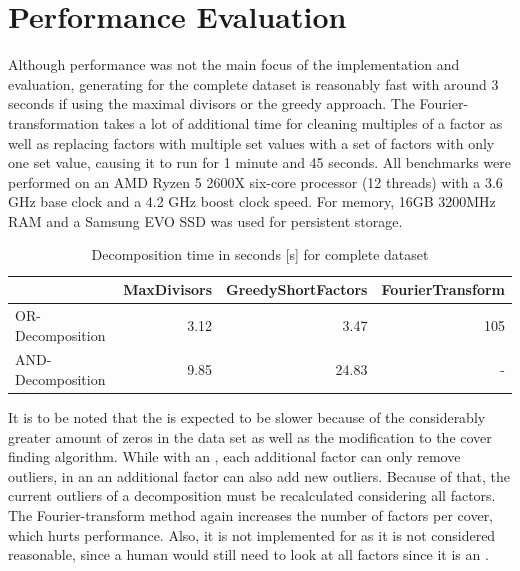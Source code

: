\section{Performance Evaluation}
\label{ch:Evaluation:performance}
Although performance was not the main focus of the implementation and evaluation, generating \orDecomp for the complete dataset is reasonably fast with around 3 seconds if using the maximal divisors or the greedy approach.
The Fourier-transformation takes a lot of additional time for cleaning multiples of a factor as well as replacing factors with multiple set values with a set of factors with only one set value, causing it to run for 1 minute and 45 seconds.
All benchmarks were performed on an AMD Ryzen 5 2600X six-core processor (12 threads) with a 3.6 GHz base clock and a 4.2 GHz boost clock speed. For memory, 16GB 3200MHz RAM and a Samsung EVO SSD was used for persistent storage.
\begin{table}[h]
	\begin{tabular}{l|rrr}
		 & MaxDivisors & GreedyShortFactors & FourierTransform  \\
		\hline
		 OR-Decomposition & 3.12 & 3.47 & 105 \\
		 AND-Decomposition & 9.85 & 24.83 & - \\
		 	
	\end{tabular}
	\caption{Decomposition time in seconds [s] for complete dataset}
	\label{tab:eval-performance}
\end{table}
It is to be noted that the \andDecomp is expected to be slower because of the considerably greater amount of zeros in the data set as well as the modification to the cover finding algorithm.
While with an \orDecomp, each additional factor can only remove outliers, in an \andDecomp an additional factor can also add new outliers.
Because of that, the current outliers of a decomposition must be recalculated considering all factors.
The Fourier-transform method again increases the number of factors per cover, which hurts performance.
Also, it is not implemented for \andDecomp as it is not considered reasonable, since a human would still need to look at all factors since it is an \andDecomp.

